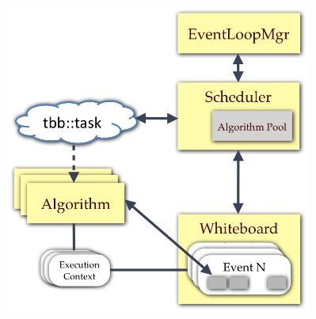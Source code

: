 \documentclass[10pt]{beamer}
\begin{document}
\begin{frame}
\begin{columns}
\begin{column}{0.7\textwidth}
    \end{column}
    \begin{column}{0.35\textwidth}
\begin{figure}
  \begin{center}
    \includegraphics[width=0.95\textwidth]{figs/gaudi-hive.png}
  \end{center}
\end{figure}
    \end{column}
  \end{columns}
\end{frame}
\end{document}
